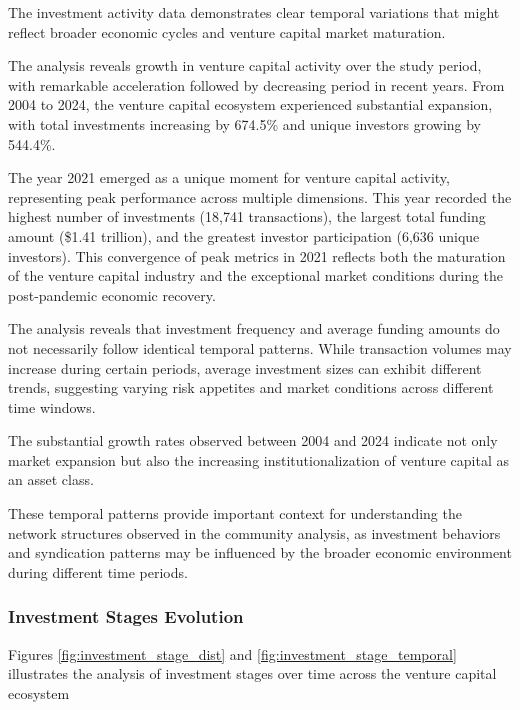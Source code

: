 The investment activity data demonstrates clear temporal variations that might reflect broader economic cycles and venture capital market maturation. 

The analysis reveals growth in venture capital activity over the study period, with remarkable acceleration followed by decreasing period in recent years. From 2004 to 2024, the venture capital ecosystem experienced substantial expansion, with total investments increasing by 674.5\% and unique investors growing by 544.4\%.

The year 2021 emerged as a unique moment for venture capital activity, representing peak performance across multiple dimensions. This year recorded the highest number of investments (18,741 transactions), the largest total funding amount (\$1.41 trillion), and the greatest investor participation (6,636 unique investors). This convergence of peak metrics in 2021 reflects both the maturation of the venture capital industry and the exceptional market conditions during the post-pandemic economic recovery.

The analysis reveals that investment frequency and average funding amounts do not necessarily follow identical temporal patterns. While transaction volumes may increase during certain periods, average investment sizes can exhibit different trends, suggesting varying risk appetites and market conditions across different time windows. 

The substantial growth rates observed between 2004 and 2024 indicate not only market expansion but also the increasing institutionalization of venture capital as an asset class.

These temporal patterns provide important context for understanding the network structures observed in the community analysis, as investment behaviors and syndication patterns may be influenced by the broader economic environment during different time periods. 


\subsubsection{Investment Stages Evolution}

Figures \ref{fig:investment_stage_dist} and \ref{fig:investment_stage_temporal} illustrates the analysis of investment stages over time across the venture capital ecosystem

